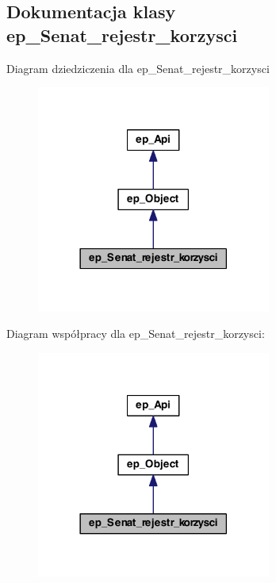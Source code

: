\hypertarget{classep___senat__rejestr__korzysci}{\subsection{Dokumentacja klasy ep\-\_\-\-Senat\-\_\-rejestr\-\_\-korzysci}
\label{classep___senat__rejestr__korzysci}
}


Diagram dziedziczenia dla ep\-\_\-\-Senat\-\_\-rejestr\-\_\-korzysci\nopagebreak
\begin{figure}[H]
\begin{center}
\leavevmode
\includegraphics[width=218pt]{classep___senat__rejestr__korzysci__inherit__graph}
\end{center}
\end{figure}


Diagram współpracy dla ep\-\_\-\-Senat\-\_\-rejestr\-\_\-korzysci\-:\nopagebreak
\begin{figure}[H]
\begin{center}
\leavevmode
\includegraphics[width=218pt]{classep___senat__rejestr__korzysci__coll__graph}
\end{center}
\end{figure}
